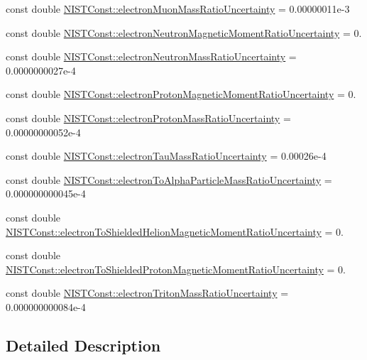 \begin{DoxyCompactItemize}
\item 
const double \hyperlink{group___n_i_s_t_const-_electron_ga7e23872fb8b3c8d61b957580f9c35197}{N\+I\+S\+T\+Const\+::electron\+Muon\+Mass\+Ratio\+Uncertainty} = 0.\+00000011e-\/3
\item 
const double \hyperlink{group___n_i_s_t_const-_electron_ga0831234ba4a3e050f3def6928140287e}{N\+I\+S\+T\+Const\+::electron\+Neutron\+Magnetic\+Moment\+Ratio\+Uncertainty} = 0.
\item 
const double \hyperlink{group___n_i_s_t_const-_electron_gad43c7267105ded23b41ec9afcefdd19d}{N\+I\+S\+T\+Const\+::electron\+Neutron\+Mass\+Ratio\+Uncertainty} = 0.\+0000000027e-\/4
\item 
const double \hyperlink{group___n_i_s_t_const-_electron_ga1ffa85ab2921b18e02e1e4bb9584c597}{N\+I\+S\+T\+Const\+::electron\+Proton\+Magnetic\+Moment\+Ratio\+Uncertainty} = 0.
\item 
const double \hyperlink{group___n_i_s_t_const-_electron_gaa6a62a5a0190d5554ffbc63abe98b4ab}{N\+I\+S\+T\+Const\+::electron\+Proton\+Mass\+Ratio\+Uncertainty} = 0.\+00000000052e-\/4
\item 
const double \hyperlink{group___n_i_s_t_const-_electron_ga1550ca2fa257e862b364df16feb6b0ca}{N\+I\+S\+T\+Const\+::electron\+Tau\+Mass\+Ratio\+Uncertainty} = 0.\+00026e-\/4
\item 
const double \hyperlink{group___n_i_s_t_const-_electron_gada80eb52952da33c11f6daa11cc0813b}{N\+I\+S\+T\+Const\+::electron\+To\+Alpha\+Particle\+Mass\+Ratio\+Uncertainty} = 0.\+000000000045e-\/4
\item 
const double \hyperlink{group___n_i_s_t_const-_electron_ga79766e2a2ad98bf3fe7e38271ad826a4}{N\+I\+S\+T\+Const\+::electron\+To\+Shielded\+Helion\+Magnetic\+Moment\+Ratio\+Uncertainty} = 0.
\item 
const double \hyperlink{group___n_i_s_t_const-_electron_ga334eecd21a41f4c879792b187b949946}{N\+I\+S\+T\+Const\+::electron\+To\+Shielded\+Proton\+Magnetic\+Moment\+Ratio\+Uncertainty} = 0.
\item 
const double \hyperlink{group___n_i_s_t_const-_electron_ga424cccf2b6f72fd447313bac0994029e}{N\+I\+S\+T\+Const\+::electron\+Triton\+Mass\+Ratio\+Uncertainty} = 0.\+000000000084e-\/4
\end{DoxyCompactItemize}


\subsection{Detailed Description}


